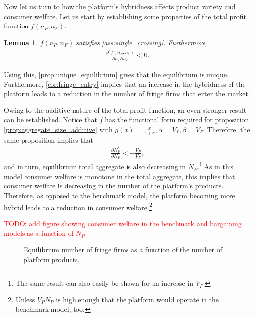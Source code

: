 \documentclass[a4paper]{article}
\newtheorem{lemma}{Lemma}
\begin{document}
Now let us turn to how the platform's hybridness affects product variety and consumer welfare.
Let us start by establishing some properties of the total profit function $f(n_P, n_F)$.
\begin{lemma}
    \label{lem:profit_assumptions}
    $f(n_P, n_F)$ satisfies \cref{ass:single_crossing}.
    Furthermore,
    \begin{align*}
        \frac{\partial^2 f(n_P, n_F)}{\partial n_P \partial n_F} < 0.
    \end{align*}
\end{lemma}
Using this, \cref{prop:unique_equilibrium} gives that the equilibrium is unique.
Furthermore, \cref{cor:fringe_entry} implies that an increase in the hybridness of the platform leads to a reduction in the number of fringe firms that enter the market.

Owing to the additive nature of the total profit function, an even stronger result can be established.
Notice that $f$ has the functional form required for proposition \ref{prop:aggregate_size_additive} with $g(x) = \frac{x}{1+x}, \alpha = V_P, \beta = V_F$.
Therefore, the same proposition implies that
\begin{align*}
    \frac{\partial N_F^*}{\partial N_P} < -\frac{V_P}{V_F},
\end{align*}
and in turn, equilibrium total aggregate is also decreasing in $N_P$.\footnote{
    The same result can also easily be shown for an increase in $V_P$.
}
As in this model consumer welfare is monotone in the total aggregate, this implies that consumer welfare is decreasing in the number of the platform's products.
Therefore, as opposed to the benchmark model, the platform becoming more hybrid leads to a reduction in consumer welfare.\footnote{
    Unless $V_P N_P$ is high enough that the platform would operate in the benchmark model, too.
}

\textcolor{red}{TODO: add figure showing consumer welfare in the benchmark and bargaining models as a function of $N_P$}

\begin{figure}
    \centering
    \caption{Equilibrium number of fringe firms as a function of the number of platform products.}
    \label{fig:fringe_entry_eq}
\end{figure}
\end{document}
